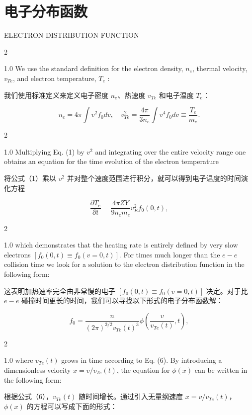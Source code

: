 \documentclass[oneside,onecolumn]{article}
\newcommand\enzhbox[2]{
  	\quad\par \begin{paracol}{2} \colseprulecolor{black} 
  			\begin{spacing}{1.0}
  				\footnotesize  #1
  			\end{spacing}
  		\switchcolumn[1] 
  		#2
  	\end{paracol} 
  }
\begin{document}
\begin{sloppypar}
{}
  
  \section{电子分布函数}

 {  \small ELECTRON DISTRIBUTION FUNCTION\par }
 
\enzhbox{   We use the standard definition for the electron density, $n_{e}$, thermal velocity, $v_{T e}$, and electron temperature, $T_{e}$ :
}{
我们使用标准定义来定义电子密度 $n_{e}$、热速度 $v_{T e}$ 和电子温度 $T_{e}$：

}
  
  \begin{dmath}[compact]
  n_{e}=4 \pi \int v^{2} f_{0} d v, \quad v_{T e}^{2}=\frac{4 \pi}{3 n_{e}} \int v^{4} f_{0} d v \equiv \frac{T_{e}}{m_{e}} .
  \end{dmath}
  
 
\enzhbox{   Multiplying Eq. (1) by $v^{2}$ and integrating over the entire velocity range one obtains an equation for the time evolution of the electron temperature
}{
将公式（1）乘以 $v^{2}$ 并对整个速度范围进行积分，就可以得到电子温度的时间演化方程

}
  
  \begin{dmath}[compact]
  \frac{\partial T_{e}}{\partial t}=\frac{4 \pi Z Y}{9 n_{e} m_{e}} v_{E}^{2} f_{0}(0, t),
  \end{dmath}
  
 
\enzhbox{   which demonstrates that the heating rate is entirely defined by very slow electrons $\left[f_{0}(0, t) \equiv f_{0}(v=0, t)\right]$. For times much longer than the $e-e$ collision time we look for a solution to the electron distribution function in the following form:
}{
这表明加热速率完全由非常慢的电子 $\left[f_{0}(0, t) \equiv f_{0}(v=0, t)\right]$ 决定。对于比 $e-e$ 碰撞时间更长的时间，我们可以寻找以下形式的电子分布函数解：

}
  
  \begin{dmath}[compact]
  f_{0}=\frac{n}{(2 \pi)^{3 / 2} v_{T e}(t)^{3}} \phi\left(\frac{v}{v_{T e}(t)}, t\right),
  \end{dmath}
  
 
\enzhbox{   where $v_{T e}(t)$ grows in time according to Eq. (6). By introducing a dimensionless velocity $x=v / v_{T e}(t)$, the equation for $\phi(x)$ can be written in the following form:
}{
根据公式（6），$v_{T e}(t)$ 随时间增长。通过引入无量纲速度 $x=v / v_{T e}(t)$，$\phi(x)$ 的方程可以写成下面的形式：

}
\end{sloppypar}
\end{document}
